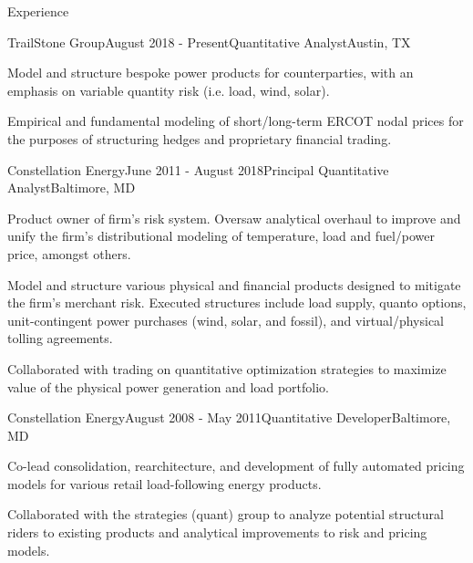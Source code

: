 \documentclass{resume} %
\begin{document}
\begin{rSection}{Experience}

\begin{rSubsection}{TrailStone Group}{August 2018 - Present}{Quantitative
    Analyst}{Austin, TX}
  \item Model and structure bespoke power products for counterparties, with an
    emphasis on variable quantity risk (i.e. load, wind, solar).
  \item Empirical and fundamental modeling of short/long-term ERCOT nodal prices
    for the purposes of structuring hedges and proprietary financial trading.
\end{rSubsection}

\begin{rSubsection}{Constellation Energy}{June 2011 -
    August 2018}{Principal Quantitative Analyst}{Baltimore, MD}
\item Product owner of firm's risk system. Oversaw analytical
  overhaul to improve and unify the firm's
  distributional modeling of temperature, load and fuel/power price, amongst others.
\item Model and structure various physical and financial products
  designed to mitigate the firm's merchant risk.  Executed structures include
  load supply, quanto options,  unit-contingent power purchases (wind, solar,
  and fossil), and virtual/physical tolling agreements.
\item Collaborated with trading on quantitative optimization strategies to maximize value of the physical power generation and load portfolio.
\end{rSubsection}




\begin{rSubsection}{Constellation Energy}{August 2008 - May 2011}{Quantitative Developer}{Baltimore, MD}
\item Co-lead consolidation, rearchitecture, and development of fully automated
  pricing models for various retail load-following energy products.
\item Collaborated with the strategies (quant) group to analyze potential structural riders to
  existing products and analytical improvements to risk and pricing models.
\end{rSubsection}


\end{rSection}
\end{document}

